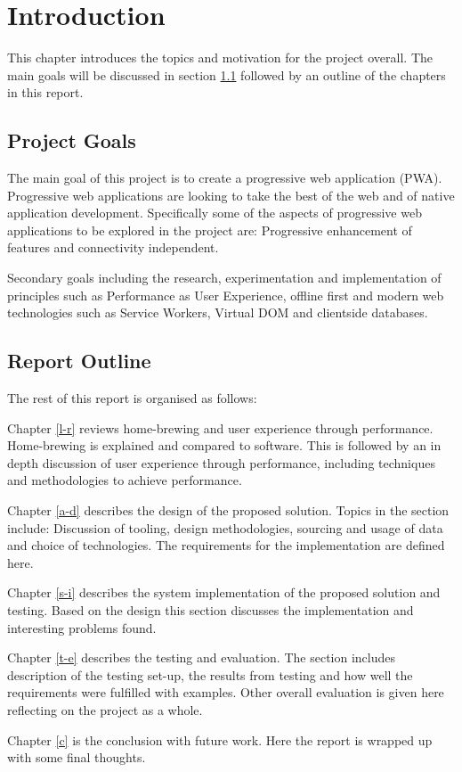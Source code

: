 \chapter{Introduction} \label{i}

This chapter introduces the topics and motivation for the project overall. The main goals will be discussed in section \ref{i--project-goals} followed by an outline of the chapters in this report.

\section{Project Goals} \label{i--project-goals}

The main goal of this project is to create a progressive web application (PWA). Progressive web applications are looking to take the best of the web and of native application development. Specifically some of the aspects of progressive web applications to be explored in the project are: Progressive enhancement of features and connectivity independent. \cite{pwa}

Secondary goals including the research, experimentation and implementation of principles such as Performance as User Experience, offline first and modern web technologies such as Service Workers, Virtual DOM and clientside databases.

\section{Report Outline} \label{i--report-outline}

The rest of this report is organised as follows:

Chapter \ref{l-r} reviews home-brewing and user experience through performance. Home-brewing is explained and compared to software. This is followed by an in depth discussion of user experience through performance, including techniques and methodologies to achieve performance.

Chapter \ref{a-d} describes the design of the proposed solution. Topics in the section include: Discussion of tooling, design methodologies, sourcing and usage of data and choice of technologies. The requirements for the implementation are defined here.

Chapter \ref{s-i} describes the system implementation of the proposed solution and testing. Based on the design this section discusses the implementation and interesting problems found.

Chapter \ref{t-e} describes the testing and evaluation. The section includes description of the testing set-up, the results from testing and how well the requirements were fulfilled with examples. Other overall evaluation is given here reflecting on the project as a whole.

Chapter \ref{c} is the conclusion with future work. Here the report is wrapped up with some final thoughts.
